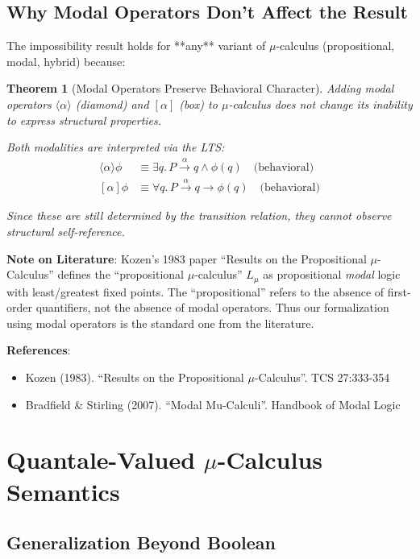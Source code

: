 \documentclass[11pt]{article}
\newtheorem{theorem}{Theorem}
\begin{document}
\subsection{Why Modal Operators Don't Affect the Result}

The impossibility result holds for **any** variant of $\mu$-calculus (propositional, modal, hybrid) because:

\begin{theorem}[Modal Operators Preserve Behavioral Character]
Adding modal operators $\langle\alpha\rangle$ (diamond) and $[\alpha]$ (box) to $\mu$-calculus does not change its inability to express structural properties.

Both modalities are interpreted via the LTS:
\begin{align*}
\langle\alpha\rangle\phi &\equiv \exists q.\, P \xrightarrow{\alpha} q \land \phi(q) \quad \text{(behavioral)} \\
[\alpha]\phi &\equiv \forall q.\, P \xrightarrow{\alpha} q \to \phi(q) \quad \text{(behavioral)}
\end{align*}

Since these are still determined by the transition relation, they cannot observe structural self-reference.
\end{theorem}

\textbf{Note on Literature}: Kozen's 1983 paper ``Results on the Propositional $\mu$-Calculus'' defines the ``propositional $\mu$-calculus'' $L_\mu$ as propositional \emph{modal} logic with least/greatest fixed points. The ``propositional'' refers to the absence of first-order quantifiers, not the absence of modal operators. Thus our formalization using modal operators is the standard one from the literature.

\textbf{References}:
\begin{itemize}
\item Kozen (1983). ``Results on the Propositional $\mu$-Calculus''. TCS 27:333-354
\item Bradfield \& Stirling (2007). ``Modal Mu-Calculi''. Handbook of Modal Logic
\end{itemize}

\section{Quantale-Valued $\mu$-Calculus Semantics}

\subsection{Generalization Beyond Boolean}
\end{document}
